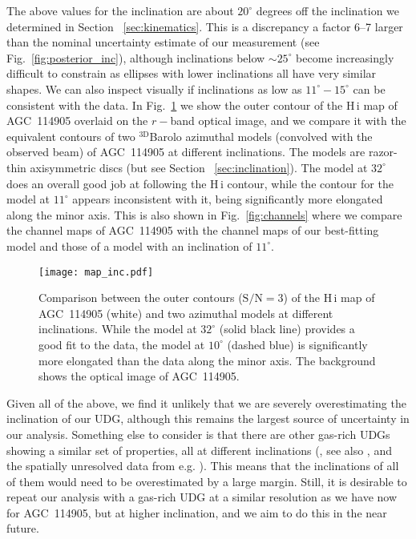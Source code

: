 \documentclass[fleqn,usenatbib]{mnras}
\begin{document}
The above values for the inclination are about $20^\circ$ degrees off the inclination we determined in Section~ \ref{sec:kinematics}. This is a discrepancy a factor 6--7 larger than the nominal uncertainty estimate of our measurement (see Fig.~\ref{fig:posterior_inc}), although inclinations below $\sim 25^\circ$ become increasingly difficult to constrain as ellipses with lower inclinations all have very similar shapes. We can also inspect visually if inclinations as low as $11^\circ-15^\circ$ can be consistent with the data. In Fig.~\ref{fig:map_inclinations} we show the outer contour of the H\,{\sc i} map of AGC~114905 overlaid on the $r-$band optical image, and we compare it with the equivalent contours of two $\mathrm{^{3D}}$Barolo azimuthal models (convolved with the observed beam) of AGC~114905 at different inclinations. The models are razor-thin axisymmetric discs (but see Section~ \ref{sec:inclination}). The model at $32^\circ$ does an overall good job at following the H\,{\sc i} contour, while the contour for the model at $11^\circ$ appears inconsistent with it, being significantly more elongated along the minor axis. This is also shown in Fig.~\ref{fig:channels} where we compare the channel maps of AGC~114905 with the channel maps of our best-fitting model and those of a model with an inclination of $11^\circ$.


\begin{figure}
    \centering
    \texttt{[image: map\_inc.pdf]}
    \caption{Comparison between the outer contours ($\textrm{S/N}=3$) of the H\,{\sc i} map of AGC~114905 (white) and two azimuthal models at different inclinations. While the model at $32^\circ$ (solid black line) provides a good fit to the data, the model at $10^\circ$ (dashed blue) is significantly more elongated than the data along the minor axis. The background shows the optical image of AGC~114905.}
    \label{fig:map_inclinations}
\end{figure}
 
Given all of the above, we find it unlikely that we are severely overestimating the inclination of our UDG, although this remains the largest source of uncertainty in our analysis. Something else to consider is that there are other gas-rich UDGs showing a similar set of properties, all at different inclinations (\citealt{huds2019,huds2020}, see also \citealt{sengupta2019,shi2021}, and the spatially unresolved data from e.g. \citealt{leisman2017,karunakaran2020}). This means that the inclinations of all of them would need to be overestimated by a large margin. Still, it is desirable to repeat our analysis with a gas-rich UDG at a similar resolution as we have now for AGC~114905, but at higher inclination, and we aim to do this in the near future. 
\end{document}
